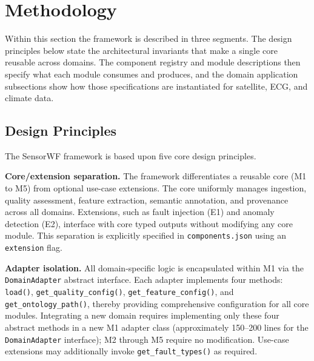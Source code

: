 \documentclass[conference]{IEEEtran}
\begin{document}

\section{Methodology}

Within this section the framework is described in three segments. The design principles below state the architectural invariants that make a single core reusable across domains. The component registry and module descriptions then specify what each module consumes and produces, and the domain application subsections show how those specifications are instantiated for satellite, ECG, and climate data.


\subsection{Design Principles}

The SensorWF framework is based upon five core design principles.

\textbf{Core/extension separation.} The framework differentiates a reusable core (M1 to M5) from optional use-case extensions. The core uniformly manages ingestion, quality assessment, feature extraction, semantic annotation, and provenance across all domains. Extensions, such as fault injection (E1) and anomaly detection (E2), interface with core typed outputs without modifying any core module. This separation is explicitly specified in \texttt{components.json} using an \texttt{extension} flag.

\textbf{Adapter isolation.} All domain-specific logic is encapsulated within M1 via the \texttt{DomainAdapter} abstract interface. Each adapter implements four methods: \texttt{load()}, \texttt{get\_quality\_config()}, \texttt{get\_feature\_config()}, and \texttt{get\_ontology\_path()}, thereby providing comprehensive configuration for all core modules. Integrating a new domain requires implementing only these four abstract methods in a new M1 adapter class (approximately 150--200 lines for the \texttt{DomainAdapter} interface); M2 through M5 require no modification. Use-case extensions may additionally invoke \texttt{get\_fault\_types()} as required.
\end{document}
